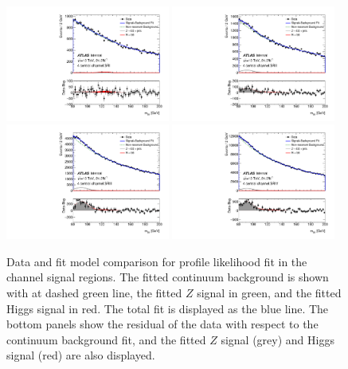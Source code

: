 \begin{figure}[htbp]
  \centering
 \includegraphics[width=0.48\textwidth]{figures/VBF/unblind_testVBF_ICHEP_4cen_SRI.pdf}
 \includegraphics[width=0.48\textwidth]{figures/VBF/unblind_testVBF_ICHEP_4cen_SRII.pdf}\\
 \includegraphics[width=0.48\textwidth]{figures/VBF/unblind_testVBF_ICHEP_4cen_SRIII.pdf}
 \includegraphics[width=0.48\textwidth]{figures/VBF/unblind_testVBF_ICHEP_4cen_SRIV.pdf}\\
\caption{Data and fit model comparison for profile likelihood fit in the \fourcentral channel signal regions. The fitted continuum background is shown with at  dashed green line, the fitted $Z$ signal in green, and the fitted Higgs signal in red.  The total fit is displayed as the blue line.  The bottom panels show the residual of the data with respect to the continuum background fit, and the fitted $Z$ signal (grey) and Higgs signal (red) are also displayed.}
  \label{fig:vbf-higgsfit_4cen}
\end{figure}


